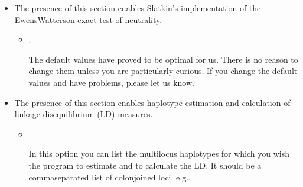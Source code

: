 \documentclass[letterpaper,10pt,english,openany,oneside]{sphinxmanual}
\begin{document}
\begin{itemize}
\begin{itemize}
\item {} 
\sphinxAtStartPar
{}.

\sphinxAtStartPar
Markov chain sample size\sphinxstylestrong{{[}Default:}  \sphinxstylestrong{{]}}.

\end{itemize}

\sphinxAtStartPar
Note that the  number of steps in the Monte\sphinxhyphen{}Carlo Markov
chain is the product of  and , so the
default values described above would contain 1,000,000 (= 1000 x
1000) steps in the MCMC chain.

\sphinxAtStartPar
The default values for options described above have proved to be
optimal for us and if the options are not provided these defaults
will be used. If you change the values and have problems, please let
us .

\item {} 
\sphinxAtStartPar
\sphinxcode{\sphinxupquote{{[}HomozygosityEWSlatkinExact{]}}}

\sphinxAtStartPar
The presence of this section enables Slatkin’s 
implementation of the Ewens\sphinxhyphen{}Watterson exact test of neutrality.
\begin{itemize}
\item {} 
\sphinxAtStartPar
{}.

\sphinxAtStartPar
The default values have proved to be optimal for us. There is no
reason to change them unless you are particularly curious. If you
change the default values and have problems, please let us know.

\end{itemize}

\item {} 
\sphinxAtStartPar
\sphinxcode{\sphinxupquote{{[}Emhaplofreq{]}}}

\sphinxAtStartPar
The presence of this section enables haplotype estimation and
calculation of linkage disequilibrium (LD) measures.
\begin{itemize}
\item {} 
\sphinxAtStartPar
{}.

\sphinxAtStartPar
In this option you can list the multi\sphinxhyphen{}locus haplotypes for which
you wish the program to estimate and to calculate the LD. It
should be a comma\sphinxhyphen{}separated list of colon\sphinxhyphen{}joined loci. e.g.,


\end{itemize}
\end{itemize}
\end{document}
